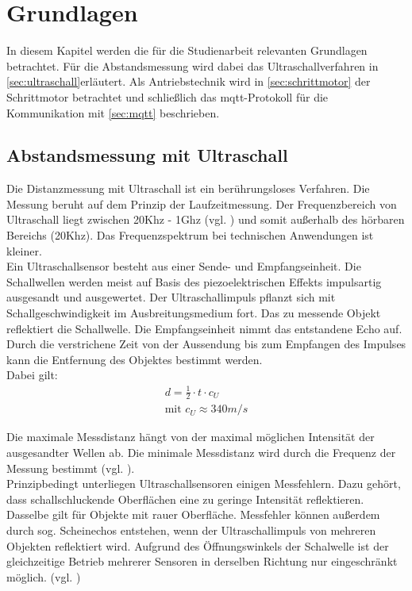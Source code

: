 
\chapter{Grundlagen}
\label{cha:grundlagen}
In diesem Kapitel werden die für die Studienarbeit relevanten Grundlagen betrachtet. Für die Abstandsmessung wird dabei das Ultraschallverfahren in \autoref {sec:ultraschall}erläutert. Als Antriebstechnik wird in \autoref{sec:schrittmotor} der Schrittmotor betrachtet und schließlich das \acrshort{mqtt}-Protokoll für die Kommunikation mit \autoref{sec:mqtt} beschrieben. 

\section{Abstandsmessung mit Ultraschall}
\label{sec:ultraschall}
Die Distanzmessung mit Ultraschall ist ein berührungsloses Verfahren. Die Messung  beruht auf dem Prinzip der Laufzeitmessung. Der Frequenzbereich von Ultraschall liegt zwischen 20Khz - 1Ghz (vgl. \cite{ultraschallbereich}) und somit außerhalb des hörbaren Bereichs (20Khz).  Das Frequenzspektrum bei technischen Anwendungen ist kleiner. \\
Ein Ultraschallsensor besteht aus einer Sende- und Empfangseinheit. Die Schallwellen werden meist auf Basis des piezoelektrischen Effekts impulsartig ausgesandt und ausgewertet.  Der Ultraschallimpuls pflanzt sich mit Schallgeschwindigkeit im Ausbreitungsmedium fort. Das zu messende Objekt reflektiert die Schallwelle. Die Empfangseinheit nimmt das entstandene Echo auf. Durch die verstrichene Zeit von der Aussendung bis zum Empfangen des Impulses kann die Entfernung des Objektes bestimmt werden. \\

Dabei gilt:
\begin{align}
d = \frac{1}{2} \cdot t\cdot c_U\\
\text{mit }  c_U \approx 340m/s 
\end{align}

\newpage
Die maximale Messdistanz hängt von der maximal möglichen Intensität der ausgesandter Wellen ab. Die minimale Messdistanz wird durch die Frequenz der Messung bestimmt (vgl. \cite{ultraschallUni}). \\
Prinzipbedingt unterliegen Ultraschallsensoren einigen Messfehlern. Dazu gehört, dass schallschluckende Oberflächen eine zu geringe Intensität reflektieren. Dasselbe gilt für Objekte mit rauer Oberfläche. Messfehler können außerdem durch sog. Scheinechos entstehen, wenn der Ultraschallimpuls von mehreren Objekten reflektiert wird. Aufgrund des Öffnungswinkels der Schalwelle ist der gleichzeitige Betrieb mehrerer Sensoren in derselben Richtung nur eingeschränkt möglich. (vgl. \cite{ultraschallBa})

